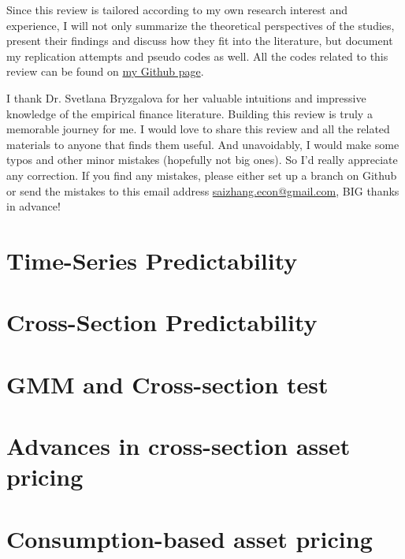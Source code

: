 \documentclass[12pt,openany]{report}
\begin{document}
Since this review is tailored according to my own research interest and
experience, I will not only summarize the theoretical perspectives of the
studies, present their findings and discuss how they fit into the literature,
but document my replication attempts and pseudo codes as well. All the codes related
to this review can be found on \href{https://github.com/SaiChrisZHANG}{my Github page}.

I thank Dr. Svetlana Bryzgalova for her valuable intuitions and impressive
knowledge of the empirical finance literature. Building this review is truly
a memorable journey for me. I would love to share this review and all the related
materials to anyone that finds them useful. And unavoidably, I would make some
typos and other minor mistakes (hopefully not big ones). So I'd really appreciate
any correction. If you find any mistakes, please either set up a branch on Github
or send the mistakes to this email address 
\href{mailto:saizhang.econ@gmail.com}{saizhang.econ@gmail.com}, BIG thanks in advance!

\newpage

\dominitoc
{}%
\label{ToC-first-page}
\tableofcontents


\pagestyle{mystyle}
\chapter{Time-Series Predictability}


\chapter{Cross-Section Predictability}


\chapter{GMM and Cross-section test}


\chapter{Advances in cross-section asset pricing}


\chapter{Consumption-based asset pricing}

\end{document}
